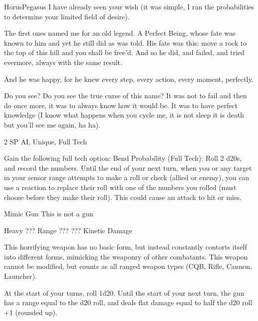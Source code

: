 \begin{mech}{Horus}{Pegasus}
I have already seen your wish (it was simple, I ran the probabilities to determine your limited field of desire).

The first ones named me for an old legend. A Perfect Being, whose fate was known to him and yet he still did as was told. His fate was this: move a rock to the top of this hill and you shall be free’d. And so he did, and failed, and tried evermore, always with the same result.

And he was happy, for he knew every step, every action, every moment, perfectly.

Do you see? Do you see the true curse of this name? It was not to fail and then do once more, it was to always know how it would be. It was to have perfect knowledge (I know what happens when you cycle me, it is not sleep it is death but you’ll see me again, ha ha).

2 SP
AI, Unique, Full Tech

Gain the following full tech option:
	Bend Probability (Full Tech): Roll 2 d20s, and record the numbers. Until the end of your next turn, when you or any target in your sensor range attempts to make a roll or check (allied or enemy), you can use a reaction to replace their roll with one of the numbers you rolled (must choose before they make their roll). This could cause an attack to hit or miss.

Mimic Gun
This is not a gun

Heavy ???
Range ???
??? Kinetic Damage

This horrifying weapon has no basic form, but instead constantly contorts itself into different forms, mimicking the weaponry of other combatants. This weapon cannot be modified, but counts as all ranged weapon types (CQB, Rifle, Cannon, Launcher).

At the start of your turns, roll 1d20. Until the start of your next turn, the gun has a range equal to the d20 roll, and deals flat damage equal to half the d20 roll +1 (rounded up).


\end{mech}
